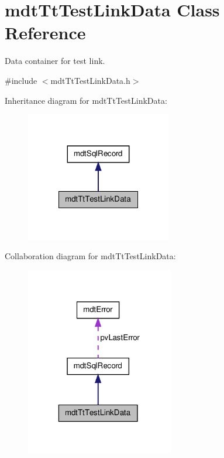 \hypertarget{classmdt_tt_test_link_data}{\section{mdt\-Tt\-Test\-Link\-Data Class Reference}
\label{classmdt_tt_test_link_data}
}


Data container for test link.  




{\ttfamily \#include $<$mdt\-Tt\-Test\-Link\-Data.\-h$>$}



Inheritance diagram for mdt\-Tt\-Test\-Link\-Data\-:
\nopagebreak
\begin{figure}[H]
\begin{center}
\leavevmode
\includegraphics[width=180pt]{classmdt_tt_test_link_data__inherit__graph}
\end{center}
\end{figure}


Collaboration diagram for mdt\-Tt\-Test\-Link\-Data\-:
\nopagebreak
\begin{figure}[H]
\begin{center}
\leavevmode
\includegraphics[width=184pt]{classmdt_tt_test_link_data__coll__graph}
\end{center}
\end{figure}
